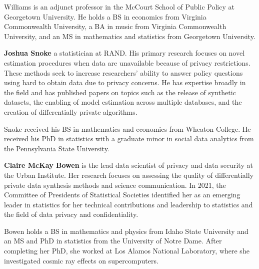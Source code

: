 
Williams is an adjunct professor in the McCourt School of Public Policy at Georgetown University. He holds a BS in economics from Virginia Commonwealth University, a BA in music from Virginia Commonwealth University, and an MS in mathematics and statistics from Georgetown University.

\noindent\textbf{Joshua Snoke} a statistician at RAND. His primary research focuses on novel estimation procedures when data are unavailable because of privacy restrictions. These methods seek to increase researchers’ ability to answer policy questions using hard to obtain data due to privacy concerns. He has expertise broadly in the field and has published papers on topics such as the release of synthetic datasets, the enabling of model estimation across multiple databases, and the creation of differentially private algorithms.


Snoke received his BS in mathematics and economics from Wheaton College. He received his PhD in statistics with a graduate minor in social data analytics from the Pennsylvania State University.

\noindent\textbf{Claire McKay Bowen} is the lead data scientist of privacy and data security at the Urban Institute. Her research focuses on assessing the quality of differentially private data synthesis methods and science communication. In 2021, the Committee of Presidents of Statistical Societies identified her as an emerging leader in statistics for her technical contributions and leadership to statistics and the field of data privacy and confidentiality.

Bowen holds a BS in mathematics and physics from Idaho State University and an MS and PhD in statistics from the University of Notre Dame. After completing her PhD, she worked at Los Alamos National Laboratory, where she investigated cosmic ray effects on supercomputers.